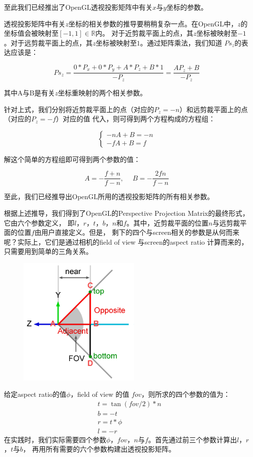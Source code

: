 \documentclass[12pt]{article}
\begin{document}
\noindent{}至此我们已经推出了OpenGL透视投影矩阵中有关$x$与$y$坐标的参数。

\indent{}透视投影矩阵中有关$z$坐标的相关参数的推导要稍稍复杂一点。在OpenGL中，$z$的坐标值会被映射至$[-1,1]\in\mathbb{R}$内。
对于近剪裁平面上的点，其$z$坐标被映射至$-1$。对于远剪裁平面上的点，其$z$坐标被映射至$1$。通过矩阵乘法，我们知道
$Ps_z$的表达应该是：

\begin{displaymath}
Ps_z = \frac{0*P_x + 0 * P_y + A * P_z + B * 1}{-P_z} = \frac{AP_z + B}{-P_z}
\end{displaymath}

\noindent{}其中A与B是有关$z$坐标重映射的两个相关参数。

\indent{}针对上式，我们分别将近剪裁平面上的点（对应的$P_z=-n$）和远剪裁平面上的点（对应的$P_z=-f$）对应的值
代入，则可得到两个方程构成的方程组：

\begin{displaymath}
\left\{ \begin{array}{ll} {-nA + B} = -n\\
{-fA + B} = f \end{array} \right.
\end{displaymath}

\noindent{}解这个简单的方程组即可得到两个参数的值：

\begin{displaymath}
A = -\frac{f+n}{f-n}, \quad\; B = -\frac{2fn}{f-n}
\end{displaymath}

\noindent{}至此，我们已经推导出OpenGL所用的透视投影矩阵的所有相关参数。

\indent{}根据上述推导，我们得到了OpenGL的Perspective Projection Matrix的最终形式，它由六个参数定义，
即$l$，$r$，$t$，$b$，$n$和$f$。其中，近剪裁平面的位置$n$与远剪裁平面的位置$f$由用户直接定义。但是，
剩下的四个与screen相关的参数是从何而来呢？实际上，它们是通过相机的field of view 与screen的aspect ratio
计算而来的，只需要用到简单的三角关系。

\begin{figure}[h]
\centering
\includegraphics[width=6cm]{./imgs/openglsetup.png}
\end{figure}

\noindent{}给定aspect ratio的值$\phi$，field of view 的值 $fov$，则所求的四个参数的值为：
\begin{align*}
&t = \tan(fov/2) * n\\
&b = -t\\
&r = t * \phi\\
&l = -r
\end{align*}
\indent{}在实践时，我们实际需要四个参数$\phi$，$fov$，$n$与$f$。首先通过前三个参数计算出$l$，$r$，$t$与$b$，
再用所有需要的六个参数构建出透视投影矩阵。
\end{document}
